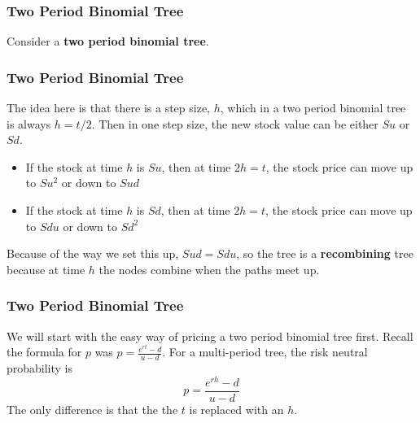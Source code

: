 \documentclass{beamer}
\theoremstyle{plain}
\theoremstyle{definition}
\theoremstyle{remark}
\begin{document}
\begin{frame}
\frametitle{Two Period Binomial Tree}
Consider a \textbf{two period binomial tree}. 
\end{frame}

\begin{frame}
\frametitle{Two Period Binomial Tree}

The idea here is that there is a step size, $h$, which in a two period binomial tree is always $h = t/2$. Then in one step size, the new stock value can be either $Su$ or $Sd$.
\begin{itemize}
\item If the stock at time $h$ is $Su$, then at time $2h = t$, the stock price can move up to $Su^2$ or down to $Sud$
\item If the stock at time $h$ is $Sd$, then at time $2h = t$, the stock price can move up to $Sdu$ or down to $Sd^2$
\end{itemize}

Because of the way we set this up, $Sud = Sdu$, so the tree is a \textbf{recombining} tree because at time $h$ the nodes combine when the paths meet up.

\end{frame}


\begin{frame}
\frametitle{Two Period Binomial Tree}

We will start with the easy way of pricing a two period binomial tree first. Recall the formula for $p$ was $p = \frac{e^{rt} - d}{u-d}$. For a multi-period tree, the risk neutral probability is \[p = \frac{e^{rh} - d}{u-d}\] The only difference is that the the $t$ is replaced with an $h$. 

\end{frame}
\end{document}
